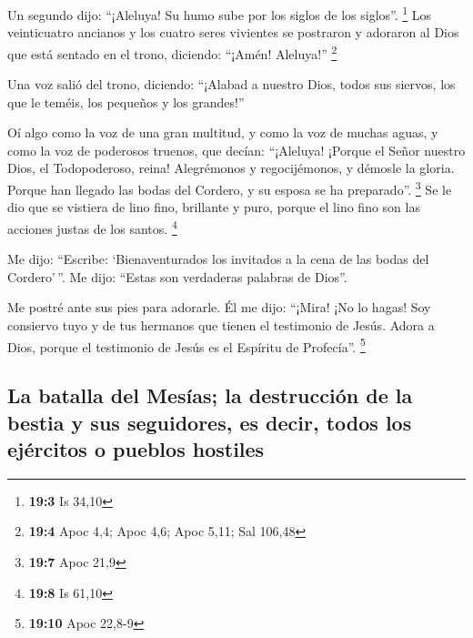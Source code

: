  Un segundo dijo: ``¡Aleluya! Su humo sube por los siglos
de los siglos''. \footnote{\textbf{19:3} Is 34,10}  Los
veinticuatro ancianos y los cuatro seres vivientes se postraron y
adoraron al Dios que está sentado en el trono, diciendo: ``¡Amén!
Aleluya!'' \footnote{\textbf{19:4} Apoc 4,4; Apoc 4,6; Apoc 5,11; Sal
  106,48}

 Una voz salió del trono, diciendo: ``¡Alabad a nuestro
Dios, todos sus siervos, los que le teméis, los pequeños y los
grandes!''

 Oí algo como la voz de una gran multitud, y como la voz
de muchas aguas, y como la voz de poderosos truenos, que decían:
``¡Aleluya! ¡Porque el Señor nuestro Dios, el Todopoderoso, reina!
 Alegrémonos y regocijémonos, y démosle la gloria. Porque
han llegado las bodas del Cordero, y su esposa se ha preparado''.
\footnote{\textbf{19:7} Apoc 21,9}  Se le dio que se
vistiera de lino fino, brillante y puro, porque el lino fino son las
acciones justas de los santos. \footnote{\textbf{19:8} Is 61,10}

 Me dijo: ``Escribe: `Bienaventurados los invitados a la
cena de las bodas del Cordero'\,''. Me dijo: ``Estas son verdaderas
palabras de Dios''.

 Me postré ante sus pies para adorarle. Él me dijo:
``¡Mira! ¡No lo hagas! Soy consiervo tuyo y de tus hermanos que tienen
el testimonio de Jesús. Adora a Dios, porque el testimonio de Jesús es
el Espíritu de Profecía''. \footnote{\textbf{19:10} Apoc 22,8-9}

\hypertarget{la-batalla-del-mesuxedas-la-destrucciuxf3n-de-la-bestia-y-sus-seguidores-es-decir-todos-los-ejuxe9rcitos-o-pueblos-hostiles}{%
\subsection{La batalla del Mesías; la destrucción de la bestia y sus
seguidores, es decir, todos los ejércitos o pueblos
hostiles}\label{la-batalla-del-mesuxedas-la-destrucciuxf3n-de-la-bestia-y-sus-seguidores-es-decir-todos-los-ejuxe9rcitos-o-pueblos-hostiles}}

